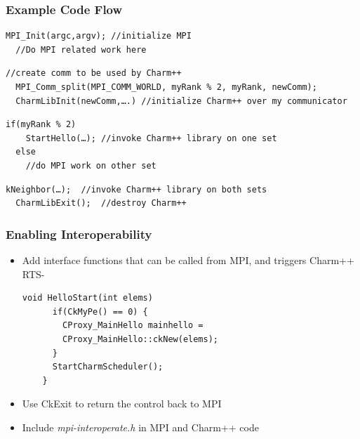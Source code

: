 \begin{frame}[fragile]
  \frametitle{Example Code Flow}
  \begin{lstlisting}[basicstyle=\footnotesize]
  MPI_Init(argc,argv); //initialize MPI
  //Do MPI related work here
  \end{lstlisting}
  \pause
  \begin{lstlisting}[basicstyle=\footnotesize]
  //create comm to be used by Charm++
  MPI_Comm_split(MPI_COMM_WORLD, myRank % 2, myRank, newComm); 
  CharmLibInit(newComm,….) //initialize Charm++ over my communicator
  \end{lstlisting}
  \pause
  \begin{lstlisting}[basicstyle=\footnotesize]
  if(myRank % 2) 
    StartHello(…); //invoke Charm++ library on one set
  else 
    //do MPI work on other set
  \end{lstlisting}
  \pause
  \begin{lstlisting}[basicstyle=\footnotesize]
  kNeighbor(…);  //invoke Charm++ library on both sets
  CharmLibExit();  //destroy Charm++ 
  \end{lstlisting}
\end{frame}

\begin{frame}[fragile]

  \frametitle{Enabling Interoperability}

  \begin{itemize}
    \item Add interface functions that can be called from MPI, and triggers
    Charm++ RTS-
    \begin{lstlisting}[basicstyle=\footnotesize]
    void HelloStart(int elems)
      if(CkMyPe() == 0) {
        CProxy_MainHello mainhello =
        CProxy_MainHello::ckNew(elems); 
      }
      StartCharmScheduler();
    }
    \end{lstlisting}
  \pause
  \item Use CkExit to return the control back to MPI
  \item Include {\em mpi-interoperate.h} in MPI and Charm++ code
  \end{itemize}
\end{frame}



